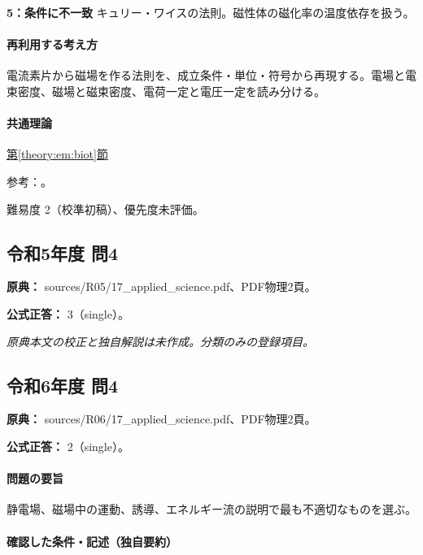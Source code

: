\noindent\textbf{5：条件に不一致} キュリー・ワイスの法則。磁性体の磁化率の温度依存を扱う。\par

\paragraph{再利用する考え方} 電流素片から磁場を作る法則を、成立条件・単位・符号から再現する。電場と電束密度、磁場と磁束密度、電荷一定と電圧一定を読み分ける。

\paragraph{共通理論} \hyperref[theory:em:biot]{第\ref*{theory:em:biot}節}

\par 参考：\cite{mit_em09}。

\par 難易度 2（校準初稿）、優先度未評価。

\subsection{令和5年度 問4}
\label{q:r05-reg-applied-04}

\noindent\textbf{原典：} sources/R05/17\_applied\_science.pdf、PDF物理2頁。

\textbf{公式正答：} 3（single）。

\par\textit{原典本文の校正と独自解説は未作成。分類のみの登録項目。}

\subsection{令和6年度 問4}
\label{q:r06-reg-applied-04}

\noindent\textbf{原典：} sources/R06/17\_applied\_science.pdf、PDF物理2頁。

\textbf{公式正答：} 2（single）。

\paragraph{問題の要旨} 静電場、磁場中の運動、誘導、エネルギー流の説明で最も不適切なものを選ぶ。

\paragraph{確認した条件・記述（独自要約）}\mbox{}\par

